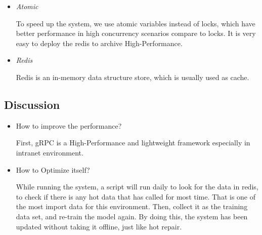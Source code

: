 \documentclass[conference]{IEEEtran}
\begin{document}
\begin{itemize}
	\item \emph{Atomic}

	      To speed up the system, we use atomic variables instead of locks, which have better performance in high concurrency scenarios compare to locks.
	      It is very easy to deploy the redis to archive High-Performance.

	\item \emph{Redis}

	      Redis is an in-memory data structure store, which is usually used as cache.
\end{itemize}

\subsection{Discussion}
\begin{itemize}
	\item How to improve the performance?

	      First, gRPC is a High-Performance and lightweight framework especially in intranet environment.

	\item How to Optimize itself?

	      While running the system, a script will run daily to look for the data in redis, to check if there is any hot data that has called for most time.
	      That is one of the most import data for this environment. Then, collect it as the training data set, and re-train the model again.
	      By doing this, the system has been updated without taking it offline, just like hot repair.

\end{itemize}
\end{document}
